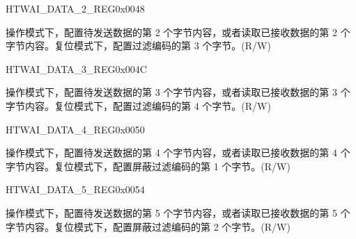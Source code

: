 \begin{register}{H}{TWAI\_DATA\_2\_REG}{0x0048}\label{regdesc:TWAIDATA2REG}
%
%
\regnewline%
\begin{regdesc}\begin{reglist}
\label{fielddesc:TWAITXDATA2}\item [TWAI\_TX\_DATA\_2] 操作模式下，配置待发送数据的第 2 个字节内容，或者读取已接收数据的第 2 个字节内容。复位模式下，配置过滤编码的第 3 个字节。(R/W)
\end{reglist}\end{regdesc}
\end{register}


\begin{register}{H}{TWAI\_DATA\_3\_REG}{0x004C}\label{regdesc:TWAIDATA3REG}
%
%
\regnewline%
\begin{regdesc}\begin{reglist}
\label{fielddesc:TWAITXDATA3}\item [TWAI\_TX\_DATA\_3] 操作模式下，配置待发送数据的第 3 个字节内容，或者读取已接收数据的第 3 个字节内容。复位模式下，配置过滤编码的第 4 个字节。(R/W)
\end{reglist}\end{regdesc}
\end{register}


\begin{register}{H}{TWAI\_DATA\_4\_REG}{0x0050}\label{regdesc:TWAIDATA4REG}
%
%
\regnewline%
\begin{regdesc}\begin{reglist}
\label{fielddesc:TWAITXDATA4}\item [TWAI\_TX\_DATA\_4] 操作模式下，配置待发送数据的第 4 个字节内容，或者读取已接收数据的第 4 个字节内容。复位模式下，配置屏蔽过滤编码的第 1 个字节。(R/W)
\end{reglist}\end{regdesc}
\end{register}


\begin{register}{H}{TWAI\_DATA\_5\_REG}{0x0054}\label{regdesc:TWAIDATA5REG}
%
%
\regnewline%
\begin{regdesc}\begin{reglist}
\label{fielddesc:TWAITXDATA5}\item [TWAI\_TX\_DATA\_5] 操作模式下，配置待发送数据的第 5 个字节内容，或者读取已接收数据的第 5 个字节内容。复位模式下，配置屏蔽过滤编码的第 2 个字节。(R/W)
\end{reglist}\end{regdesc}
\end{register}


